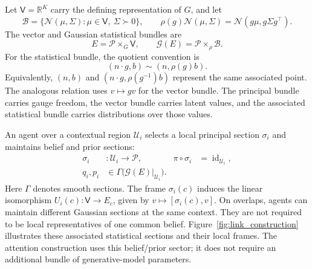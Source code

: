 \documentclass[twoside,11pt]{article}
\begin{document}
Let \(\mathsf V=\mathbb R^K\) carry the defining representation of \(G\), and let
\begin{equation}
\mathcal B=\{\mathcal N(\mu,\Sigma):\mu\in\mathsf V,\ \Sigma\succ0\},
\qquad
\rho(g)\mathcal N(\mu,\Sigma)=\mathcal N(g\mu,g\Sigma g^\top).
\label{eq:gaussian_associated_action}
\end{equation}
The vector and Gaussian statistical bundles are
\begin{equation}
E=\mathcal P\times_G\mathsf V,
\qquad
\mathcal G(E)=\mathcal P\times_\rho\mathcal B.
\label{eq:associated_state_bundles}
\end{equation}
For the statistical bundle, the quotient convention is
\begin{equation}
(n\cdot g,b)\sim(n,\rho(g)b).
\label{eq:associated_quotient}
\end{equation}
Equivalently, \((n,b)\) and \((n\cdot g,\rho(g^{-1})b)\) represent the same associated point. The analogous relation uses \(v\mapsto gv\) for the vector bundle. The principal bundle carries gauge freedom, the vector bundle carries latent values, and the associated statistical bundle carries distributions over those values.

An agent over a contextual region \(\mathcal U_i\) selects a local principal section \(\sigma_i\) and maintains belief and prior sections:
\begin{equation}
\begin{aligned}
\sigma_i&:\mathcal U_i\longrightarrow\mathcal P,
&\pi\circ\sigma_i&=\operatorname{id}_{\mathcal U_i},\\
q_i,p_i&\in\Gamma\bigl(\mathcal G(E)|_{\mathcal U_i}\bigr).
\end{aligned}
\label{eq:agent_bundle_sections}
\end{equation}
Here \(\Gamma\) denotes smooth sections. The frame \(\sigma_i(c)\) induces the linear isomorphism \(U_i(c):\mathsf V\to E_c\), given by \(v\mapsto[\sigma_i(c),v]\). On overlaps, agents can maintain different Gaussian sections at the same context. They are not required to be local representatives of one common belief. Figure~\ref{fig:link_construction} illustrates these associated statistical sections and their local frames. The attention construction uses this belief/prior sector; it does not require an additional bundle of generative-model parameters.
\end{document}
